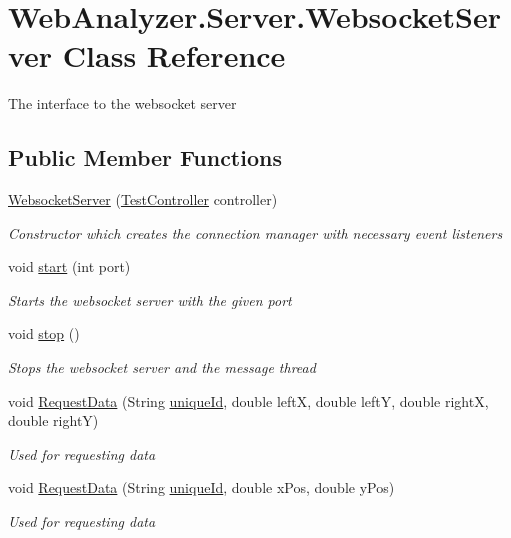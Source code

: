 \hypertarget{class_web_analyzer_1_1_server_1_1_websocket_server}{}\section{Web\+Analyzer.\+Server.\+Websocket\+Server Class Reference}
\label{class_web_analyzer_1_1_server_1_1_websocket_server}


The interface to the websocket server  


\subsection*{Public Member Functions}
\begin{DoxyCompactItemize}
\item 
\hyperlink{class_web_analyzer_1_1_server_1_1_websocket_server_a3fddc08875cc188f4fb799ca4ccfe6ad}{Websocket\+Server} (\hyperlink{class_web_analyzer_1_1_controller_1_1_test_controller}{Test\+Controller} controller)
\begin{DoxyCompactList}\small\item\em Constructor which creates the connection manager with necessary event listeners \end{DoxyCompactList}\item 
void \hyperlink{class_web_analyzer_1_1_server_1_1_websocket_server_ae006161a22122f220e0788cf8894cfb6}{start} (int port)
\begin{DoxyCompactList}\small\item\em Starts the websocket server with the given port \end{DoxyCompactList}\item 
void \hyperlink{class_web_analyzer_1_1_server_1_1_websocket_server_a2c5391b6ebe427d2d42d7b601b922e5b}{stop} ()
\begin{DoxyCompactList}\small\item\em Stops the websocket server and the message thread \end{DoxyCompactList}\item 
void \hyperlink{class_web_analyzer_1_1_server_1_1_websocket_server_acab32c7df617492c47da886956332d9f}{Request\+Data} (String \hyperlink{_u_i_2_h_t_m_l_resources_2js_2lib_2underscore_8min_8js_af690ff5521d79c7128861033ae80ae17}{unique\+Id}, double left\+X, double left\+Y, double right\+X, double right\+Y)
\begin{DoxyCompactList}\small\item\em Used for requesting data \end{DoxyCompactList}\item 
void \hyperlink{class_web_analyzer_1_1_server_1_1_websocket_server_aa0ffcc2e38d0a5c7f85e6c50b283718a}{Request\+Data} (String \hyperlink{_u_i_2_h_t_m_l_resources_2js_2lib_2underscore_8min_8js_af690ff5521d79c7128861033ae80ae17}{unique\+Id}, double x\+Pos, double y\+Pos)
\begin{DoxyCompactList}\small\item\em Used for requesting data \end{DoxyCompactList}\end{DoxyCompactItemize}
